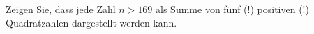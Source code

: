 
\begin{exercise}

Zeigen Sie, dass jede Zahl $n > 169$ als Summe von fünf (!) positiven (!)
Quadratzahlen dargestellt werden kann.

\end{exercise}


\begin{solution}

\phantom{}

\end{solution}

